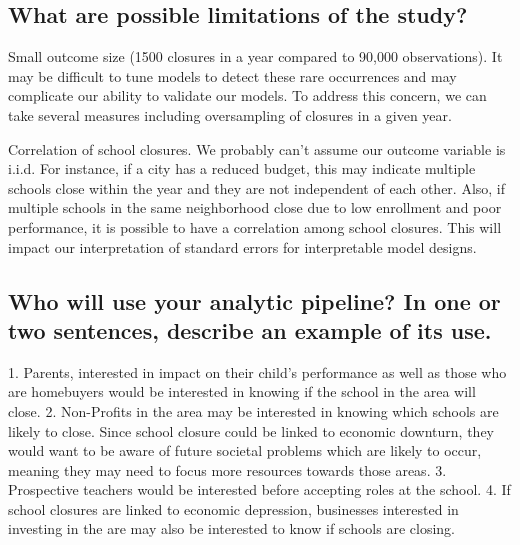\documentclass[twoside,11pt]{article}
\begin{document}
\subsection{What are possible limitations of the study?}

Small outcome size (1500 closures in a year compared to 90,000 observations). It may be difficult to tune models to detect these rare occurrences and may complicate our ability to validate our models. To address this concern, we can take several measures including oversampling of closures in a given year. 

Correlation of school closures.  We probably can’t assume our outcome variable is i.i.d.  For instance, if a city has a reduced budget, this may indicate multiple schools close within the year and they are not independent of each other. Also, if multiple schools in the same neighborhood close due to low enrollment and poor performance, it is possible to have a correlation among school closures. This will impact our interpretation of standard errors for interpretable model designs. 


\subsection{Who will use your analytic pipeline? In one or two sentences, describe an example of its use.}

1.	Parents, interested in impact on their child's performance as well as those who are homebuyers would be interested in knowing if the school in the area will close.
2.	Non-Profits in the area may be interested in knowing which schools are likely to close.  Since school closure could be linked to economic downturn, they would want to be aware of future societal problems which are likely to occur, meaning they may need to focus more resources towards those areas.
3.	Prospective teachers would be interested before accepting roles at the school.
4.	If school closures are linked to economic depression, businesses interested in investing in the are may also be interested to know if schools are closing.





\end{document}
